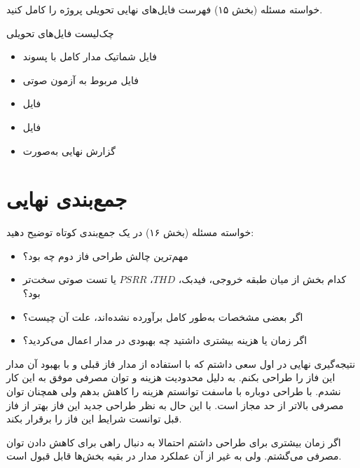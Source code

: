 \documentclass[12pt,a4paper]{article}
\begin{document}
\begin{taskbox}{خواسته مسئله (بخش ۱۵)}
فهرست فایل‌های نهایی تحویلی پروژه را کامل کنید.
\end{taskbox}

\begin{answerbox}{چک‌لیست فایل‌های تحویلی}
\begin{itemize}
    \item فایل شماتیک مدار کامل  با پسوند 
    \item فایل مربوط به آزمون صوتی
    \item فایل 
    \item فایل 
    \item گزارش نهایی به‌صورت 
\end{itemize}

\vspace{5cm}
\end{answerbox}

\newpage

\section{جمع‌بندی نهایی}

\begin{taskbox}{خواسته مسئله (بخش ۱۶)}
در یک جمع‌بندی کوتاه توضیح دهید:
\begin{itemize}
    \item مهم‌ترین چالش طراحی فاز دوم چه بود؟
    \item کدام بخش از میان طبقه خروجی، فیدبک، $THD$، $PSRR$ یا تست صوتی سخت‌تر بود؟
    \item اگر بعضی مشخصات به‌طور کامل برآورده نشده‌اند، علت آن چیست؟
    \item اگر زمان یا هزینه بیشتری داشتید چه بهبودی در مدار اعمال می‌کردید؟
\end{itemize}
\end{taskbox}

\begin{answerbox}{نتیجه‌گیری نهایی}
در اول سعی داشتم که با استفاده از مدار فاز قبلی و با بهبود آن مدار این فاز را طراحی بکنم. به دلیل محدودیت هزینه و توان مصرفی موفق به این کار نشدم. با طراحی دوباره با ماسفت توانستم هزینه را کاهش بدهم ولی همچنان توان مصرفی بالاتر از حد مجاز است. با این حال به نظر طراحی جدید این فاز بهتر از فاز قبل توانست شرایط این فاز را برقرار بکند.

اگر زمان  بیشتری برای طراحی داشتم احتمالا به دنبال راهی برای کاهش دادن توان مصرفی می‌گشتم. ولی به غیر از آن عملکرد مدار در بقیه بخش‌ها قابل قبول است. 


\end{answerbox}
\end{document}
